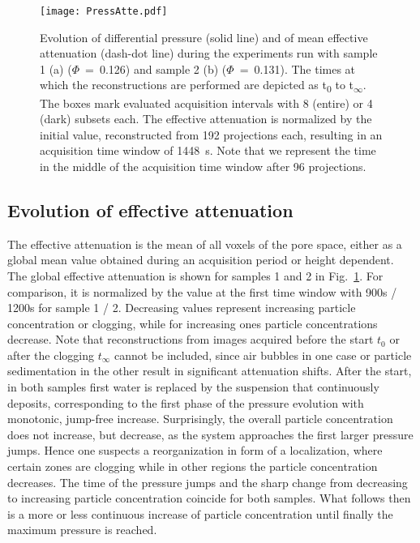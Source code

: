 \documentclass[smallextended]{svjour3}       %
\begin{document}
\begin {figure}[!hbtp]
\texttt{[image: PressAtte.pdf]}
\caption{\label{fig:PressureAttenuation} Evolution of differential pressure (solid line) and of mean effective attenuation (dash-dot line) during the experiments run with sample 1 (a) ($\Phi$~=~0.126) and sample 2 (b) ($\Phi$~=~0.131). The times at which the reconstructions are performed are depicted as t\textsubscript{0} to t\textsubscript{$\infty$}. The boxes mark evaluated acquisition intervals with 8 (entire) or 4 (dark) subsets each. The effective attenuation is normalized by the initial value, reconstructed from 192 projections each, resulting in an acquisition time window of 1448~s. Note that we represent the time in the middle of the acquisition time window after 96 projections.}
\end{figure}
\subsection{Evolution of effective attenuation}\label{subsec:attenuation}
The effective attenuation is the mean of all voxels of the pore space, either as a global mean value obtained during an acquisition period or height dependent. The global effective attenuation is shown for samples 1 and 2 in Fig.~\ref{fig:PressureAttenuation}. For comparison, it is normalized by the value at the first time window with 900s / 1200s for sample 1 / 2. Decreasing values represent increasing particle concentration or clogging, while for increasing ones particle concentrations decrease. Note that reconstructions from images acquired before the start $t_0$ or after the clogging $t_\infty$ cannot be included, since air bubbles in one case or particle sedimentation in the other result in significant attenuation shifts. After the start, in both samples first water is replaced by the suspension that continuously deposits, corresponding to the first phase of the pressure evolution with monotonic, jump-free increase. Surprisingly, the overall particle concentration does not increase, but decrease, as the system approaches the first larger pressure jumps. Hence one suspects a reorganization in form of a localization, where certain zones are clogging while in other regions the particle concentration decreases. The time of the pressure jumps and the sharp change from decreasing to increasing particle concentration coincide for both samples. What follows then is a more or less continuous increase of particle concentration until finally the maximum pressure is reached. 
\end{document}
